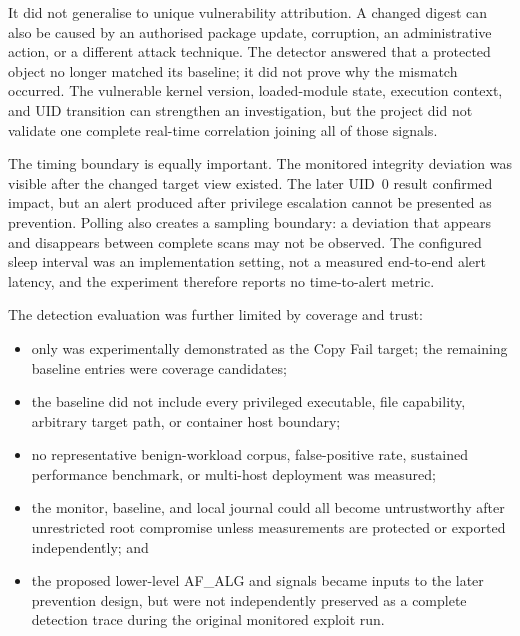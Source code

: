 It did not generalise to unique vulnerability attribution. A changed digest can
also be caused by an authorised package update, corruption, an administrative
action, or a different attack technique. The detector answered that a protected
object no longer matched its baseline; it did not prove why the mismatch
occurred. The vulnerable kernel version, loaded-module state, execution context,
and UID transition can strengthen an investigation, but the project did not
validate one complete real-time correlation joining all of those signals.

The timing boundary is equally important. The monitored integrity deviation was
visible after the changed target view existed. The later UID~0 result confirmed
impact, but an alert produced after privilege escalation cannot be presented as
prevention. Polling also creates a sampling boundary: a deviation that appears
and disappears between complete scans may not be observed. The configured
sleep interval was an implementation setting, not a measured end-to-end alert
latency, and the experiment therefore reports no time-to-alert metric.

The detection evaluation was further limited by coverage and trust:

\begin{itemize}
    \item only  was experimentally demonstrated as the Copy
    Fail target; the remaining baseline entries were coverage candidates;

    \item the baseline did not include every privileged executable, file
    capability, arbitrary target path, or container host boundary;

    \item no representative benign-workload corpus, false-positive rate,
    sustained performance benchmark, or multi-host deployment was measured;

    \item the monitor, baseline, and local journal could all become untrustworthy
    after unrestricted root compromise unless measurements are protected or
    exported independently; and

    \item the proposed lower-level AF\_ALG and  signals became
    inputs to the later prevention design, but were not independently preserved
    as a complete detection trace during the original monitored exploit run.
\end{itemize}

